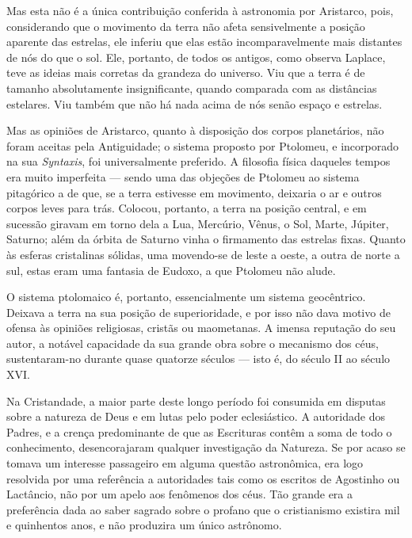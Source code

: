 \documentclass[11pt,a5paper,twoside,openany]{book}
\begin{document}
Mas esta não é a única contribuição conferida à astronomia por Aristarco, pois, considerando que o movimento da terra não afeta sensivelmente a posição aparente das estrelas, ele inferiu que elas estão incomparavelmente mais distantes de nós do que o sol. Ele, portanto, de todos os antigos, como observa Laplace, teve as ideias mais corretas da grandeza do universo. Viu que a terra é de tamanho absolutamente insignificante, quando comparada com as distâncias estelares. Viu também que não há nada acima de nós senão espaço e estrelas.

Mas as opiniões de Aristarco, quanto à disposição dos corpos planetários, não foram aceitas pela Antiguidade; o sistema proposto por Ptolomeu, e incorporado na sua \textit{Syntaxis}, foi universalmente preferido. A filosofia física daqueles tempos era muito imperfeita — sendo uma das objeções de Ptolomeu ao sistema pitagórico a de que, se a terra estivesse em movimento, deixaria o ar e outros corpos leves para trás. Colocou, portanto, a terra na posição central, e em sucessão giravam em torno dela a Lua, Mercúrio, Vênus, o Sol, Marte, Júpiter, Saturno; além da órbita de Saturno vinha o firmamento das estrelas fixas. Quanto às esferas cristalinas sólidas, uma movendo-se de leste a oeste, a outra de norte a sul, estas eram uma fantasia de Eudoxo, a que Ptolomeu não alude.

O sistema ptolomaico é, portanto, essencialmente um sistema geocêntrico. Deixava a terra na sua posição de superioridade, e por isso não dava motivo de ofensa às opiniões religiosas, cristãs ou maometanas. A imensa reputação do seu autor, a notável capacidade da sua grande obra sobre o mecanismo dos céus, sustentaram-no durante quase quatorze séculos — isto é, do século II ao século XVI.

Na Cristandade, a maior parte deste longo período foi consumida em disputas sobre a natureza de Deus e em lutas pelo poder eclesiástico. A autoridade dos Padres, e a crença predominante de que as Escrituras contêm a soma de todo o conhecimento, desencorajaram qualquer investigação da Natureza. Se por acaso se tomava um interesse passageiro em alguma questão astronômica, era logo resolvida por uma referência a autoridades tais como os escritos de Agostinho ou Lactâncio, não por um apelo aos fenômenos dos céus. Tão grande era a preferência dada ao saber sagrado sobre o profano que o cristianismo existira mil e quinhentos anos, e não produzira um único astrônomo.
\end{document}
